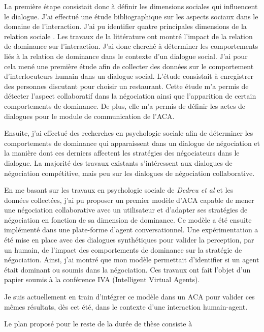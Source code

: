 \documentclass  [french] {article}
\begin{document}
	
	La première étape consistait donc à définir les dimensions sociales qui influencent le dialogue. J'ai effectué une étude bibliographique sur les aspects sociaux dans le domaine de l'interaction. J'ai pu identifier quatre principales dimensions de la relation sociale \cite{de1995impact,de2004influence}. Les travaux de la littérature ont montré l'impact de la relation de dominance sur l'interaction. J'ai donc cherché à déterminer les comportements liés à la relation de dominance dans le contexte d'un dialogue social. J'ai pour cela mené une première étude afin de collecter des données sur le comportement d'interlocuteurs humain dans un dialogue social. L'étude consistait à enregistrer des personnes discutant pour choisir un restaurant. Cette étude  m'a permis de détecter l’aspect collaboratif dans la négociation ainsi que l’apparition de certain comportements de dominance. De plus, elle  m'a permis de définir les actes de dialogues pour le module de communication de l'ACA. 
	
	Ensuite, j'ai effectué des recherches en psychologie sociale afin de déterminer les comportements de dominance qui apparaissent dans un dialogue de négociation et la manière  dont ces derniers affectent les stratégies des négociateurs dans le dialogue. La majorité des travaux existants s'intéressent aux dialogues de négociation compétitive, mais peu sur les dialogues de négociation collaborative. 
	
	En me basant sur les travaux en psychologie sociale de \emph{Dedreu et al} et les données collectées, j'ai pu proposer un premier modèle d'ACA capable de mener une négociation collaborative avec un utilisateur et d'adapter ses stratégies de négociation en fonction de sa dimension de dominance.  Ce modèle a été ensuite implémenté dans une plate-forme d'agent conversationnel. Une expérimentation a été mise en place avec des dialogues synthétiques pour valider la perception, par un humain, de l'impact des comportements de dominance sur la stratégie de négociation. Ainsi, j'ai montré que mon modèle permettait d'identifier si un agent était dominant ou soumis dans la négociation. Ces travaux ont fait l'objet d'un papier soumis à la conférence IVA (Intelligent Virtual Agents).
	
	Je suis actuellement en train d'intégrer ce modèle dans un ACA pour valider ces mêmes résultats, dès cet été, dans le contexte d'une interaction humain-agent.
	
	Le plan proposé pour le reste de la durée de thèse 	consiste à
	
\end{document}
